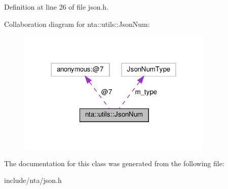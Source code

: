 Definition at line 26 of file json.\+h.



Collaboration diagram for nta\+:\+:utils\+:\+:Json\+Num\+:\nopagebreak
\begin{figure}[H]
\begin{center}
\leavevmode
\includegraphics[width=264pt]{d6/d43/classnta_1_1utils_1_1JsonNum__coll__graph}
\end{center}
\end{figure}


The documentation for this class was generated from the following file\+:\begin{DoxyCompactItemize}
\item 
include/nta/json.\+h\end{DoxyCompactItemize}
